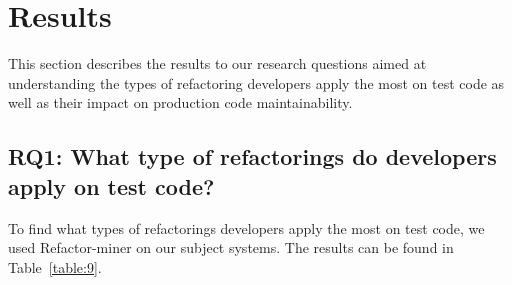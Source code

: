 \section{Results}
This section describes the results to our research questions aimed at understanding the types of refactoring developers apply the most on test code as well as their impact on production code maintainability. 

\noindent
\subsection*{RQ1: What type of refactorings do developers apply on test code?}
To find what types of refactorings developers apply the most on test code, we used Refactor-miner on our subject systems. The results can be found in Table~\ref{table:9}.



